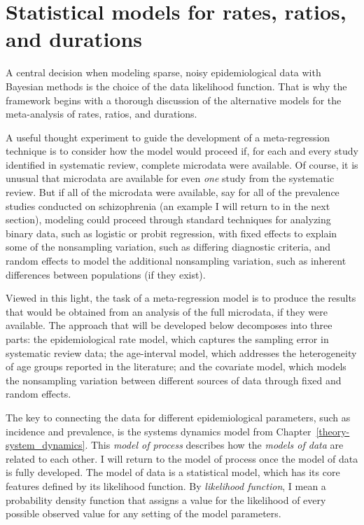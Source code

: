 \chapter{Statistical models for rates, ratios, and durations}
\label{theory-rate_model}

A central decision when modeling sparse, noisy epidemiological data
with Bayesian methods is the choice of the data likelihood function.
That is why the framework begins with a thorough discussion of the
alternative models for the meta-analysis of rates, ratios, and
durations.

A useful thought experiment to guide the development of
a meta-regression technique is to consider how the model would proceed
if, for each and every study identified in systematic review, complete
microdata were available.  Of course, it is unusual that microdata are
available for even \emph{one} study from the systematic review.  But
if all of the microdata were available, say for all of the prevalence
studies conducted on schizophrenia (an example I will return to in
the next section), modeling could proceed through standard techniques
for analyzing binary data, such as logistic or probit regression, with
fixed effects to explain some of the nonsampling variation, such as
differing diagnostic criteria, and random effects to model the
additional nonsampling variation, such as inherent differences
between populations (if they exist).

Viewed in this light, the task of a meta-regression model is to
produce the results that would be obtained from an analysis of the
full microdata, if they were available. The approach that will be
developed below decomposes into three parts: the epidemiological rate
model, which captures the sampling error in systematic review data;
the age-interval model, which addresses the heterogeneity of age
groups reported in the literature; and the covariate model, which
models the nonsampling variation between different sources of data
through fixed and random effects.

The key to connecting the data for different epidemiological
parameters, such as incidence and prevalence, is the systems dynamics
model from Chapter~\ref{theory-system_dynamics}.  This \emph{model of
  process} describes how the \emph{models of data} are related to each
other.  I will return to the model of process once the model of data
is fully developed.  The model of data is a statistical model, which
has its core features defined by its likelihood function.  By
\emph{likelihood function}, I mean a probability density function that
assigns a value for the likelihood of every possible observed value
for any setting of the model parameters.


